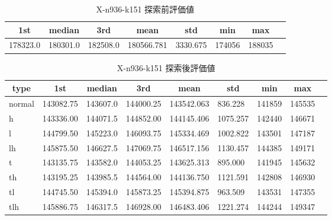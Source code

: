 \begin{table}[htbp]
    \caption{X-n936-k151 探索前評価値}
    \begin{tabular}{|l|l|l|l|l|l|l|l|}\hline
    \multicolumn{1}{|c|}{\textbf{1st}}
    &\multicolumn{1}{c|}{\textbf{median}}
    &\multicolumn{1}{c|}{\textbf{3rd}}
    &\multicolumn{1}{c|}{\textbf{mean}}
    &\multicolumn{1}{c|}{\textbf{std}}
    &\multicolumn{1}{c|}{\textbf{min}}
    &\multicolumn{1}{c|}{\textbf{max}}\\\hline
	178323.0 & 180301.0 & 182508.0 & 180566.781 & 3330.675 & 174056 & 188035\\\hline
	\end{tabular}
\end{table}
\begin{table}[htbp]
    \caption{X-n936-k151 探索後評価値}
    \begin{tabular}{|l|l|l|l|l|l|l|l|l|}\hline
    \multicolumn{1}{|c|}{\textbf{type}}
    &\multicolumn{1}{|c|}{\textbf{1st}}
    &\multicolumn{1}{c|}{\textbf{median}}
    &\multicolumn{1}{c|}{\textbf{3rd}}
    &\multicolumn{1}{c|}{\textbf{mean}}
    &\multicolumn{1}{c|}{\textbf{std}}
    &\multicolumn{1}{c|}{\textbf{min}}
    &\multicolumn{1}{c|}{\textbf{max}}\\\hline
	normal & 143082.75 & 143607.0 & 144000.25 & 143542.063 & 836.228 & 141859 & 145535\\\hline
	h & 143336.00 & 144071.5 & 144852.00 & 144145.406 & 1075.257 & 142440 & 146671\\\hline
	l & 144799.50 & 145223.0 & 146093.75 & 145334.469 & 1002.822 & 143501 & 147187\\\hline
	lh & 145875.50 & 146627.5 & 147069.75 & 146517.156 & 1130.457 & 144385 & 149171\\\hline
	t & 143135.75 & 143582.0 & 144053.25 & 143625.313 & 895.000 & 141945 & 145632\\\hline
	th & 143195.25 & 143985.5 & 144564.00 & 144136.750 & 1121.591 & 142808 & 146930\\\hline
	tl & 144745.50 & 145394.0 & 145873.25 & 145394.875 & 963.509 & 143531 & 147355\\\hline
	tlh & 145886.75 & 146317.5 & 146928.00 & 146483.406 & 1221.274 & 144244 & 149347\\\hline
	\end{tabular}
\end{table}
